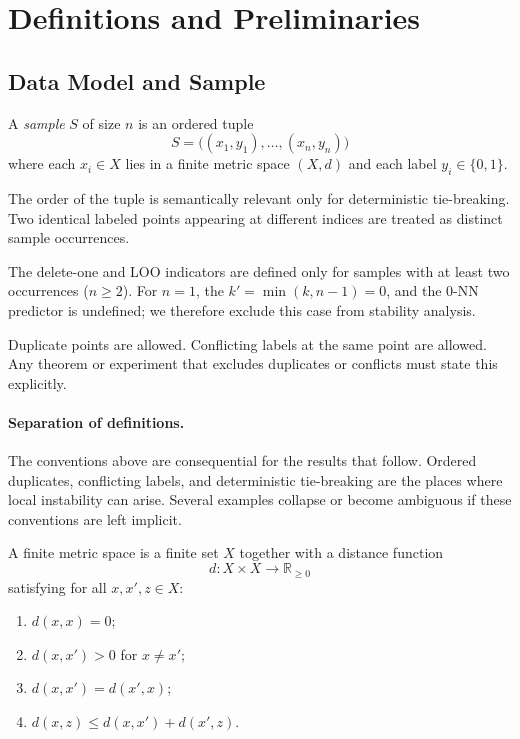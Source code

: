 \section{Definitions and Preliminaries}
\label{sec:definitions}

\subsection{Data Model and Sample}

\begin{definition}[Sample]
A \emph{sample} $S$ of size $n$ is an ordered tuple
\[
S = \big((x_1, y_1), \ldots, (x_n, y_n)\big)
\]
where each $x_i \in X$ lies in a finite metric space $(X, d)$ and each label $y_i \in \{0, 1\}$.
\end{definition}

The order of the tuple is semantically relevant only for deterministic tie-breaking. Two identical labeled points appearing at different indices are treated as distinct sample occurrences.

\begin{note}
The delete-one and LOO indicators are defined only for samples with at least two occurrences ($n \ge 2$). For $n=1$, the $k' = \min(k, n-1) = 0$, and the $0$-NN predictor is undefined; we therefore exclude this case from stability analysis.
\end{note}

\begin{note}
Duplicate points are allowed. Conflicting labels at the same point are allowed. Any theorem or experiment that excludes duplicates or conflicts must state this explicitly.
\end{note}

\paragraph{Separation of definitions.}
The conventions above are consequential for the results that follow. Ordered duplicates,
conflicting labels, and deterministic tie-breaking are the places where
local instability can arise. Several examples collapse or become
ambiguous if these conventions are left implicit.

\begin{definition}
A finite metric space is a finite set $X$ together with a distance function
\[
d : X \times X \to \mathbb{R}_{\ge 0}
\]
satisfying for all $x, x', z \in X$:
\begin{enumerate}
    \item $d(x, x) = 0$;
    \item $d(x, x') > 0$ for $x \ne x'$;
    \item $d(x, x') = d(x', x)$;
    \item $d(x, z) \le d(x, x') + d(x', z)$.
\end{enumerate}
\end{definition}

